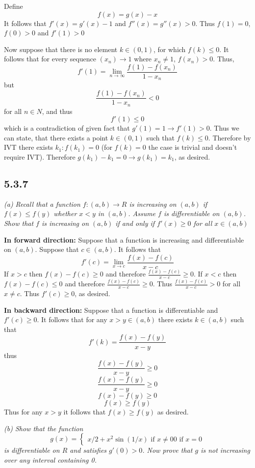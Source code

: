 \documentclass[11pt,oneside,titlepage]{book}
\begin{document}
Define
$$f(x) = g(x) - x$$
It follows that $f'(x) = g'(x) - 1$ and $f''(x) = g''(x) > 0$. Thus
$f(1) = 0$, $f(0) > 0$ and $f'(1) > 0$

Now suppose that there is no element $k \in (0, 1)$, for which
$f(k) \leq 0$. It follows that for every sequence $(x_n) \to 1$ where
$x_n \neq 1$, $f(x_n) > 0$. Thus,
$$f'(1) = \lim_{n \to \infty}\frac{f(1) - f(x_n)}{1 - x_n}$$
but
$$\frac{f(1) - f(x_n)}{1 - x_n} < 0$$
for all $n \in N$, and thus
$$f'(1) \leq 0$$
which is a contradiction of given fact that $g'(1) = 1 \to f'(1) > 0$. Thus
we can state, that there exists a point $k \in (0, 1)$ such that
$f(k) \leq 0$. Therefore by IVT there exists $k_1: f(k_1) = 0$
(for  $f(k) = 0$ the case is trivial and doesn't require IVT).
Therefore $g(k_1) - k_1 = 0 \to g(k_1) = k_1$, as desired.

\subsection*{5.3.7}
\textit{(a) Recall that a function $f: (a, b) \to R$ is increasing on $(a, b)$
  if $f(x) \leq f(y)$ whether $x < y$ in $(a, b)$. Assume $f$ is differentiable
  on $(a, b)$. Show that $f$ is increasing on $(a, b)$ if and only if
  $f'(x) \geq 0$ for all $x \in (a, b)$}

\textbf{In forward direction: }
Suppose that a function is increasing and differentiable on  $(a, b)$.
Suppose that $c \in (a, b)$. It follows that
$$f'(c) = \lim_{x \to c}\frac{f(x) - f(c)}{x - c}$$
If $x > c$ then $f(x) - f(c) \geq 0$ and therefore
$\frac{f(x) - f(c)}{x - c} \geq 0$.
If $x < c$ then $f(x) - f(c) \leq 0$ and therefore
$\frac{f(x) - f(c)}{x - c} \geq 0$.
Thus $\frac{f(x) - f(c)}{x - c} > 0$ for all $x \neq c$. Thus
$f'(c) \geq 0$, as desired.

\textbf{In backward direction: }
Suppose that a function is differentiable and $f'(c) \geq 0$. It follows that
for any $x >  y \in (a, b)$ there exists $k \in (a, b)$ such that
$$f'(k) = \frac{f(x) - f(y)}{x - y}$$
thus
$$\frac{f(x) - f(y)}{x - y} \geq 0$$
$$\frac{f(x) - f(y)}{x - y} \geq 0$$
$$f(x) - f(y) \geq 0$$
$$f(x) \geq f(y)$$
Thus for any $x > y$ it follows that $f(x) \geq f(y)$ as desired.

\textit{(b) Show that the function}
\begin{equation}
  g(x) = 
  \begin{cases}
    x / 2 + x^2 \sin(1/x) \text{ if } x \neq 0
    0 \text{ if } x = 0
  \end{cases}
\end{equation}
\textit{is differentiable on $R$ and satisfies $g'(0) > 0$. Now
  prove that $g$ is not increasing over any interval containing 0.}
\end{document}
